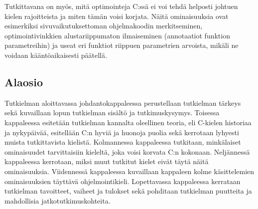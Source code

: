 Tutkittavana on myös, mitä optimointeja C:ssä ei voi tehdä helposti johtuen
kielen rajoitteista ja miten tämän voisi korjata. Näitä ominaisuuksia ovat
esimerkiksi sivuvaikutuksettoman ohjelmakoodin merkitseminen,
optimointivinkkien alustariippumaton ilmaiseminen (annotaatiot funktion
parametreihin) ja useat eri funktiot riippuen parametrien arvoista, mikäli ne
voidaan kääntöaikaisesti päätellä.

\subsection{Alaosio}

Tutkielman aloittavassa johdantokappaleessa perustellaan tutkielman tärkeys
sekä kuvaillaan lopun tutkielman sisältö ja tutkimuskysymys.
Toisessa kappaleessa esitetään tutkielman kannalta oleellinen teoria, eli
C-kielen historiaa ja nykypäivää, esitellään C:n hyviä ja huonoja puolia sekä
kerrotaan lyhyesti muista tutkittavista kielistä.
Kolmannessa kappaleessa tutkitaan, minkälaiset ominaisuudet tarvittaisiin
kieleltä, joka voisi korvata C:n kokonaan.
Neljännessä kappaleessa kerrotaan, miksi muut tutkitut kielet eivät täytä näitä
ominaisuuksia.
Viidennessä kappaleessa kuvaillaan kappaleen kolme käsittelemien ominaisuuksien
täyttävä ohjelmointikieli.
Lopettavassa kappaleessa kerrataan tutkielman tavoitteet, vaiheet ja tulokset
sekä pohditaan tutkielman puutteita ja mahdollisia jatkotutkimuskohteita.
